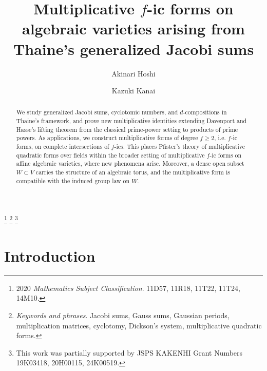 \documentclass[a4paper, 11pt]{amsart}
\theoremstyle{plain}
\theoremstyle{definition}
\numberwithin{equation}{section}
\begin{document}
\title[Multiplicative $f$-ic forms on algebraic varieties]
{Multiplicative $f$-ic forms on algebraic varieties arising from Thaine's generalized Jacobi sums}

\author[A. Hoshi]{Akinari Hoshi}
\address[A. Hoshi]{Department of Mathematics, Niigata University, Niigata 950-2181, Japan}

\author[K. Kanai]{Kazuki Kanai}
\address[K. Kanai]{Department of Computer and Information Sciences, Ibaraki University, 4-12-1, Ibaraki, 316-8511, Japan}

\footnote[0]{\textit{$2020$ Mathematics Subject Classification}. 
11D57, 11R18, 11T22, 11T24, 14M10.}
\footnote[0]{\textit{Keywords and phrases}. 
Jacobi sums, Gauss sums, Gaussian periods, multiplication matrices, 
cyclotomy, Dickson's system, multiplicative quadratic forms.}
\footnote[0]{This work was partially supported by JSPS KAKENHI Grant Numbers 19K03418, 20H00115, 24K00519.}


\begin{abstract}
We study generalized Jacobi sums, cyclotomic numbers, and $d$-compositions in Thaine's framework, and prove new multiplicative identities extending Davenport and Hasse's lifting theorem from the classical prime-power setting to products of prime powers. 
As applications, we construct multiplicative forms of degree $f\ge2$, i.e. $f$-ic forms, on complete intersections of $f$-ics. 
This places Pfister's theory of multiplicative quadratic forms over fields within the broader setting of multiplicative $f$-ic forms on affine algebraic varieties, where new phenomena arise.
Moreover, a dense open subset $W \subset V$ carries the structure of an algebraic torus, and the multiplicative form is compatible with the induced group law on $W$.
\end{abstract}

\maketitle
\tableofcontents

\section{Introduction}\label{S1}
\end{document}
